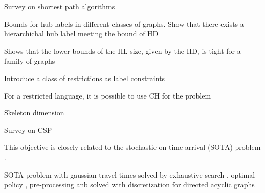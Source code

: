 Survey on shortest path algorithms \cite{goldberg_survey}

Bounds for hub labels in different classes of graphs. 
Show that there exists a hierarchichal hub label meeting the bound of HD \cite{babenko_hl_complexity}

Shows that the lower bounds of the HL size, given by the HD, is tight for a family of graphs \cite{white_complexity_hd}

Introduce a class of restrictions as label constraints \cite{language_csp}

For a restricted language, it is possible to use CH for the problem \cite{rice_csp}

Skeleton dimension \cite{skeleton}

Survey on CSP \cite{csp_survey}

This objective is closely related to the stochastic on time arrival (SOTA) problem \cite{fan2005arriving}.

SOTA problem with gaussian travel times solved by exhaustive search \cite{nikolova_gaussian}, optimal policy \cite{samaranayake2012speedup}, pre-processing \cite{sabran2014precomputation} anb solved with discretization for directed acyclic graphs \cite{nikolova_discretization}